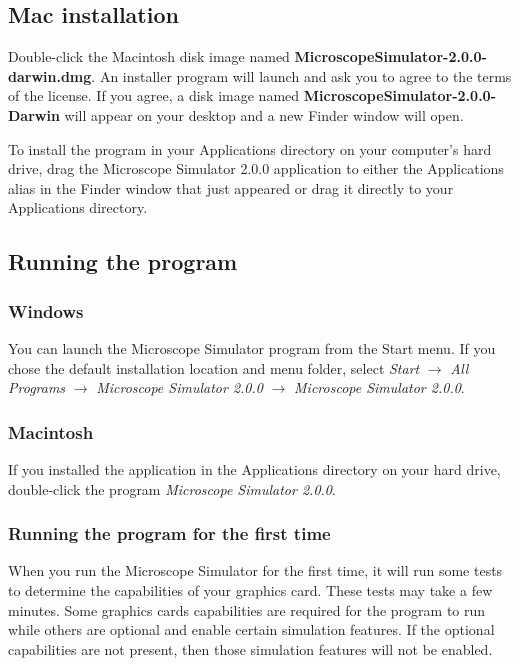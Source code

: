 \documentclass[11pt]{article}
\begin{document}
\subsection{Mac installation}

Double-click the Macintosh disk image named \textbf{MicroscopeSimulator-2.0.0-darwin.dmg}. An installer program will launch and ask you to agree to the terms of the license. If you agree, a disk image named \textbf{MicroscopeSimulator-2.0.0-Darwin} will appear on your desktop and a new Finder window will open.

To install the program in your Applications directory on your computer's hard drive, drag the Microscope Simulator 2.0.0 application to either the Applications alias in the Finder window that just appeared or drag it directly to your Applications directory.

\subsection{Running the program}

\subsubsection{Windows}

You can launch the Microscope Simulator program from the Start menu. If you chose the default installation location and menu folder, select \emph{Start} $\rightarrow$ \emph{All Programs} $\rightarrow$ \emph{Microscope Simulator 2.0.0} $\rightarrow$ \emph{Microscope Simulator 2.0.0}.

\subsubsection{Macintosh}

If you installed the application in the Applications directory on your hard drive, double-click the program \emph{Microscope Simulator 2.0.0}.

\subsubsection{Running the program for the first time}
When you run the Microscope Simulator for the first time, it will run some tests to determine the capabilities of your graphics card. These tests may take a few minutes. Some graphics cards capabilities are required for the program to run while others are optional and enable certain simulation features. If the optional capabilities are not present, then those simulation features will not be enabled.
\end{document}
